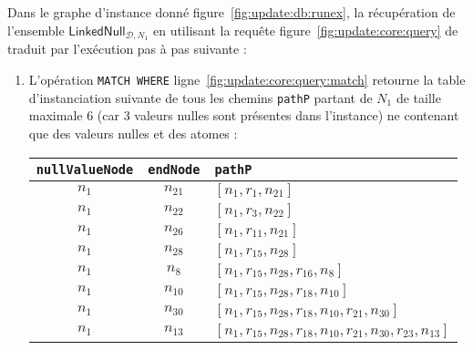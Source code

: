 \begin{example}
	Dans le graphe d'instance donné figure~\ref{fig:update:db:runex}, la récupération de l'ensemble $\textsf{LinkedNull}_{\mathcal{D}, N_1}$ en utilisant la requête figure~\ref{fig:update:core:query} de traduit par l'exécution pas à pas suivante :
	\begin{enumerate}[label=Etape~\arabic*]
		\item L'opération \verb|MATCH WHERE| ligne~\ref{fig:update:core:query:match} retourne la table d'instanciation suivante de tous les chemins \verb|pathP| partant de $N_1$ de taille maximale 6 (car 3 valeurs nulles sont présentes dans l'instance) ne contenant que des valeurs nulles et des atomes :
		      \begin{center}
			      \begin{tabular}{ccl}
				      \hline
				      \verb|nullValueNode|    & \verb|endNode|          & \verb|pathP|                                                              \\
				      \hline
				      $n_{1}$                 & $n_{21}$                & $[n_{1}, r_{1}, n_{21}]$                                                  \\
				      $n_{1}$                 & $n_{22}$                & $[n_{1}, r_{3}, n_{22}]$                                                  \\
				      $n_{1}$                 & $n_{26}$                & $[n_{1}, r_{11}, n_{21}]$                                                 \\
				      $n_{1}$                 & $n_{28}$                & $[n_{1}, r_{15}, n_{28}]$                                                 \\
				      $n_{1}$                 & $n_{8}$                 & $[n_{1}, r_{15}, n_{28}, r_{16}, n_{8}]$                                  \\
				      $n_{1}$                 & $n_{10}$                & $[n_{1}, r_{15}, n_{28}, r_{18}, n_{10}]$                                 \\
				      $n_{1}$                 & $n_{30}$                & $[n_{1}, r_{15}, n_{28}, r_{18}, n_{10}, r_{21}, n_{30}]$                 \\
				      $n_{1}$                 & $n_{13}$                & $[n_{1}, r_{15}, n_{28}, r_{18}, n_{10}, r_{21}, n_{30}, r_{23}, n_{13}]$ \\
				      \hline
			      \end{tabular}
		      \end{center}

\end{enumerate}
\end{example}
